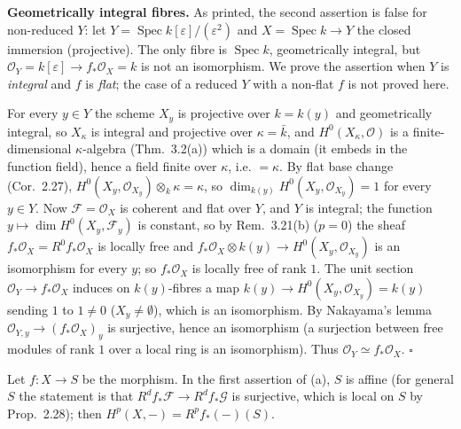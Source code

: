 \documentclass[11pt]{article}
\begin{document}
\textbf{Geometrically integral fibres.} As printed, the second assertion is false for non-reduced $Y$: let $Y=\operatorname{Spec}k[\varepsilon]/(\varepsilon^2)$ and $X=\operatorname{Spec}k\to Y$ the closed immersion (projective). The only fibre is $\operatorname{Spec}k$, geometrically integral, but $\mathcal O_Y=k[\varepsilon]\to f_*\mathcal O_X=k$ is not an isomorphism. We prove the assertion when $Y$ is \emph{integral} and $f$ is \emph{flat}; the case of a reduced $Y$ with a non-flat $f$ is not proved here.

For every $y\in Y$ the scheme $X_y$ is projective over $k=k(y)$ and geometrically integral, so $X_\kappa$ is integral and projective over $\kappa=\bar k$, and $H^0(X_\kappa,\mathcal O)$ is a finite-dimensional $\kappa$-algebra (Thm.~3.2(a)) which is a domain (it embeds in the function field), hence a field finite over $\kappa$, i.e. $=\kappa$. By flat base change (Cor.~2.27), $H^0(X_y,\mathcal O_{X_y})\otimes_k\kappa=\kappa$, so $\dim_{k(y)}H^0(X_y,\mathcal O_{X_y})=1$ for every $y\in Y$. Now $\mathcal F=\mathcal O_X$ is coherent and flat over $Y$, and $Y$ is integral; the function $y\mapsto\dim H^0(X_y,\mathcal F_y)$ is constant, so by Rem.~3.21(b) ($p=0$) the sheaf $f_*\mathcal O_X=R^0f_*\mathcal O_X$ is locally free and $f_*\mathcal O_X\otimes k(y)\to H^0(X_y,\mathcal O_{X_y})$ is an isomorphism for every $y$; so $f_*\mathcal O_X$ is locally free of rank $1$. The unit section $\mathcal O_Y\to f_*\mathcal O_X$ induces on $k(y)$-fibres a map $k(y)\to H^0(X_y,\mathcal O_{X_y})=k(y)$ sending $1$ to $1\ne0$ ($X_y\ne\emptyset$), which is an isomorphism. By Nakayama's lemma $\mathcal O_{Y,y}\to(f_*\mathcal O_X)_y$ is surjective, hence an isomorphism (a surjection between free modules of rank $1$ over a local ring is an isomorphism). Thus $\mathcal O_Y\simeq f_*\mathcal O_X$. \hfill$\square$

\pf
Let $f:X\to S$ be the morphism. In the first assertion of (a), $S$ is affine (for general $S$ the statement is that $R^df_*\mathcal F\to R^df_*\mathcal G$ is surjective, which is local on $S$ by Prop.~2.28); then $H^p(X,-)=R^pf_*(-)(S)$.
\end{document}
